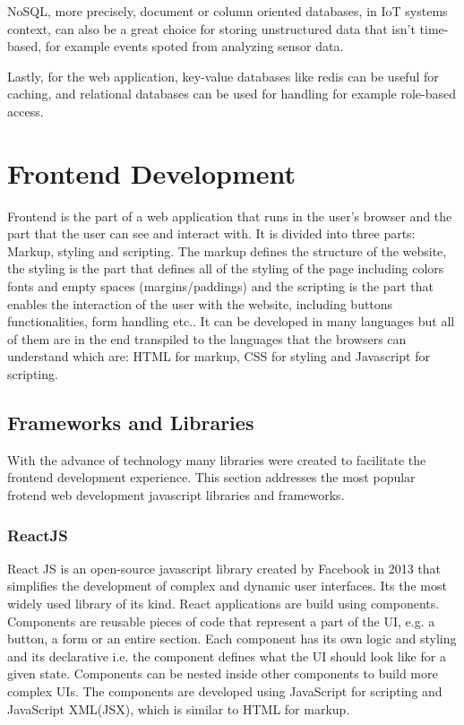 \gls{NoSQL}, more precisely, document or column oriented databases, in \gls{IoT} systems
context, can also be a great choice for storing unstructured data that isn't
time-based, for example events spoted from analyzing sensor data.

Lastly, for the web application, key-value databases like redis can be useful
for caching, and relational databases can be used for handling for example
role-based access.

\section{Frontend Development}
Frontend is the part of a web application that runs in the user's browser and
the part that the user can see and interact with. It is divided into three
parts: Markup, styling and scripting.
The markup defines the structure of the website, the styling is the part that
defines all of the styling of the page including colors fonts and empty spaces
(margins/paddings) and the scripting is the part that enables the interaction
of the user with the website, including buttons functionalities, form handling
etc..
It can be developed in many languages but all of them are in the end transpiled
to the languages that the browsers can understand which are:
\gls{HTML} for markup, \gls{CSS} for styling and Javascript for scripting.

\subsection{Frameworks and Libraries}
With the advance of technology many libraries were created to facilitate the
frontend development experience. This section addresses the most popular
frotend web development javascript libraries and frameworks.
\subsubsection{ReactJS}
React JS is an open-source javascript library created by Facebook in 2013 that
simplifies the development of complex and dynamic user interfaces. Its the most widely
used library of its kind.
React applications are build using components. Components are reusable pieces of
code that represent a part of the \gls{UI}, e.g. a button, a form or an entire section.
Each component has its own logic and styling and its declarative i.e. the
component defines what the \gls{UI} should look like for a given state.
Components can be nested inside other components to build more complex \gls{UI}s.
The components are developed using JavaScript for scripting and JavaScript \gls{XML}(\gls{JSX}),
which is similar to \gls{HTML} for markup.

